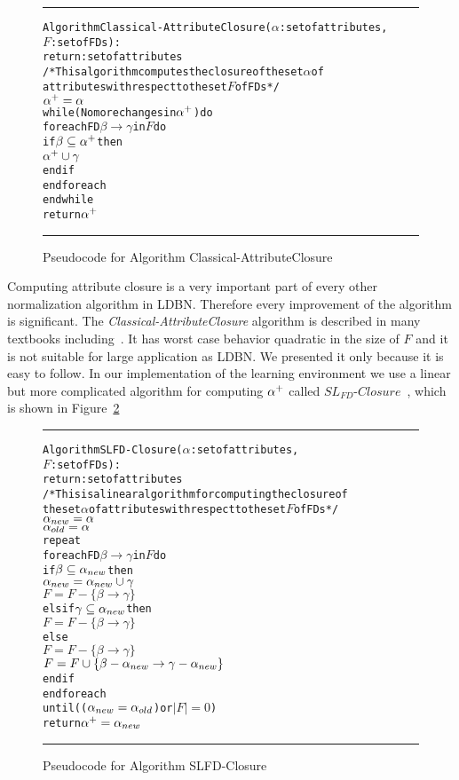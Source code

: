 \begin{figure}[htbp]
\hrule
\vspace{0.25cm}
\begin{alltt}
Algorithm Classical-AttributeClosure(\(\alpha\): set of attributes, 
              \(F\): set of FDs):
           return: set of attributes
/* This algorithm computes the closure of the set \(\alpha\) of
    attributes with respect to the set  \(F\) of FDs */
  \(\alpha\sp{+} = \alpha\)
  while(No more changes in \(\alpha\sp{+}\)) do
    foreach FD \(\beta \rightarrow \gamma\) in \(F\) do
      if \(\beta \subseteq \alpha\sp{+}\) then 
        \(\alpha\sp{+} \cup \gamma\)
      end if
    end foreach
  end while
  return \(\alpha\sp{+}\)
\end{alltt} 
\caption{Pseudocode for Algorithm Classical-AttributeClosure}\label{fig:attclosure}
\hrule
\end{figure}

Computing attribute closure is a very important part of every other normalization algorithm 
in LDBN. Therefore every improvement 
of the algorithm is significant. 
The \textit{Classical-AttributeClosure} algorithm is described in many textbooks including~\cite{bdb1, bdb2, bdb4}.
It has worst case behavior quadratic in the size of $F$ and
it is not suitable for large application as LDBN. We presented it only because it is
easy to follow. In our implementation of the learning environment we use a linear but more complicated 
algorithm for computing $\alpha\sp{+}$ 
called $SL_{FD}$-$Closure$~\cite{p10}, which is shown in Figure~\ref{alg:slfdclosure}

\begin{figure}[htbp]
\hrule
\vspace{0.25cm}
\begin{alltt}
Algorithm SLFD-Closure(\(\alpha\): set of attributes, 
              \(F\): set of FDs):
           return: set of attributes
/* This is a linear algorithm for computing the closure of 
  the set \(\alpha\) of attributes with respect to the set \(F\) of FDs */
  \(\alpha\sb{new} = \alpha\)
  \(\alpha\sb{old} = \alpha\)
  repeat
    foreach FD \(\beta \rightarrow \gamma\) in \(F\) do
      if \(\beta \subseteq \alpha\sb{new}\) then 
        \(\alpha\sb{new} = \alpha\sb{new} \cup \gamma\)
        \(F = F - \{\beta \rightarrow \gamma\}\) 
      elsif \(\gamma \subseteq \alpha\sb{new}\) then
        \(F = F - \{\beta \rightarrow \gamma\}\) 
      else
        \(F = F - \{\beta \rightarrow \gamma\}\) 
        \(F = F \cup \{\beta-\alpha\sb{new} \rightarrow \gamma-\alpha\sb{new}\}\) 
      end if
    end foreach 
  until ((\(\alpha\sb{new} = \alpha\sb{old}\)) or \(|F| = 0\))
  return \(\alpha\sp{+} = \alpha\sb{new}\)
\end{alltt} 
\caption{Pseudocode for Algorithm SLFD-Closure}\label{alg:slfdclosure}
\hrule
\end{figure}

